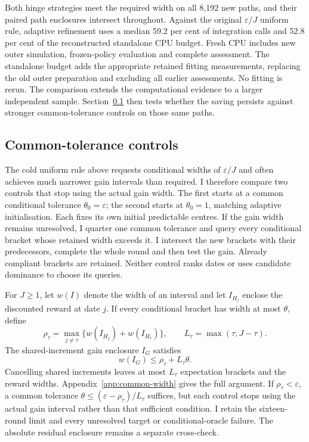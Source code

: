 \documentclass[11pt]{article}
\begin{document}
Both hinge strategies meet the required width on all 8,192 new paths, and their paired path enclosures intersect throughout. Against the original $\varepsilon/J$ uniform rule, adaptive refinement uses a median 59.2 per cent of integration calls and 52.8 per cent of the reconstructed standalone CPU budget. Fresh CPU includes new outer simulation, frozen-policy evaluation and complete assessment. The standalone budget adds the appropriate retained fitting measurements, replacing the old outer preparation and excluding all earlier assessments. No fitting is rerun. The comparison extends the computational evidence to a larger independent sample. Section~\ref{sec:common-tolerance} then tests whether the saving persists against stronger common-tolerance controls on those same paths.

\subsection{Common-tolerance controls}
\label{sec:common-tolerance}

The cold uniform rule above requests conditional widths of $\varepsilon/J$ and often achieves much narrower gain intervals than required. I therefore compare two controls that stop using the actual gain width. The first starts at a common conditional tolerance $\theta_0=\varepsilon$; the second starts at $\theta_0=1$, matching adaptive initialisation. Each fixes its own initial predictable centres. If the gain width remains unresolved, I quarter one common tolerance and query every conditional bracket whose retained width exceeds it. I intersect the new brackets with their predecessors, complete the whole round and then test the gain. Already compliant brackets are retained. Neither control ranks dates or uses candidate dominance to choose its queries.

For $J\geq1$, let $w(I)$ denote the width of an interval and let $I_{H_j}$ enclose the discounted reward at date $j$. If every conditional bracket has width at most $\theta$, define
\begin{equation}
 \rho_\tau=\max_{j\ne\tau}\{w(I_{H_j})+w(I_{H_\tau})\},
 \qquad L_\tau=\max(\tau,J-\tau).
\end{equation}
The shared-increment gain enclosure $I_G$ satisfies
\begin{equation}
 w(I_G)\leq \rho_\tau+L_\tau\theta.
\label{eq:common-width}
\end{equation}
Cancelling shared increments leaves at most $L_\tau$ expectation brackets and the reward widths. Appendix~\ref{app:common-width} gives the full argument. If $\rho_\tau<\varepsilon$, a common tolerance $\theta\leq(\varepsilon-\rho_\tau)/L_\tau$ suffices, but each control stops using the actual gain interval rather than that sufficient condition. I retain the sixteen-round limit and every unresolved target or conditional-oracle failure. The absolute residual enclosure remains a separate cross-check.
\end{document}

